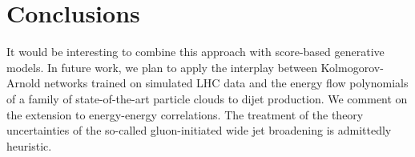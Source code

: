 \section{Conclusions}\label{sec:conclusions}

It would be interesting to combine this approach with score-based
generative models. In future work, we plan to apply the interplay
between Kolmogorov-Arnold networks trained on simulated LHC data and the
energy flow polynomials of a family of state-of-the-art particle clouds
to dijet production. We comment on the extension to energy-energy
correlations. The treatment of the theory uncertainties of the so-called
gluon-initiated wide jet broadening is admittedly heuristic.

